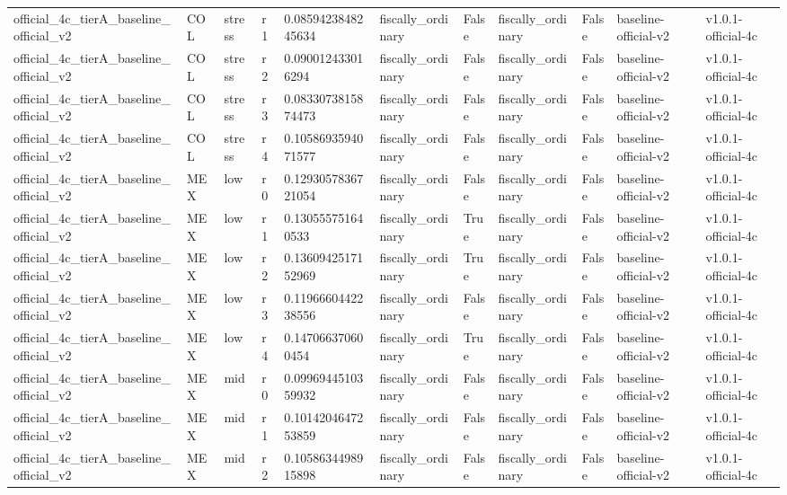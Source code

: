 \begin{landscape}
\begin{longtable}{lllllllllll}
official\_4c\_tierA\_baseline\_official\_v2 & COL & stress & r1 & 0.0859423848245634 & fiscally\_ordinary & False & fiscally\_ordinary & False & baseline-official-v2 & v1.0.1-official-4c \\
official\_4c\_tierA\_baseline\_official\_v2 & COL & stress & r2 & 0.090012433016294 & fiscally\_ordinary & False & fiscally\_ordinary & False & baseline-official-v2 & v1.0.1-official-4c \\
official\_4c\_tierA\_baseline\_official\_v2 & COL & stress & r3 & 0.0833073815874473 & fiscally\_ordinary & False & fiscally\_ordinary & False & baseline-official-v2 & v1.0.1-official-4c \\
official\_4c\_tierA\_baseline\_official\_v2 & COL & stress & r4 & 0.1058693594071577 & fiscally\_ordinary & False & fiscally\_ordinary & False & baseline-official-v2 & v1.0.1-official-4c \\
official\_4c\_tierA\_baseline\_official\_v2 & MEX & low & r0 & 0.1293057836721054 & fiscally\_ordinary & False & fiscally\_ordinary & False & baseline-official-v2 & v1.0.1-official-4c \\
official\_4c\_tierA\_baseline\_official\_v2 & MEX & low & r1 & 0.130555751640533 & fiscally\_ordinary & True & fiscally\_ordinary & False & baseline-official-v2 & v1.0.1-official-4c \\
official\_4c\_tierA\_baseline\_official\_v2 & MEX & low & r2 & 0.1360942517152969 & fiscally\_ordinary & True & fiscally\_ordinary & False & baseline-official-v2 & v1.0.1-official-4c \\
official\_4c\_tierA\_baseline\_official\_v2 & MEX & low & r3 & 0.1196660442238556 & fiscally\_ordinary & False & fiscally\_ordinary & False & baseline-official-v2 & v1.0.1-official-4c \\
official\_4c\_tierA\_baseline\_official\_v2 & MEX & low & r4 & 0.147066370600454 & fiscally\_ordinary & True & fiscally\_ordinary & False & baseline-official-v2 & v1.0.1-official-4c \\
official\_4c\_tierA\_baseline\_official\_v2 & MEX & mid & r0 & 0.0996944510359932 & fiscally\_ordinary & False & fiscally\_ordinary & False & baseline-official-v2 & v1.0.1-official-4c \\
official\_4c\_tierA\_baseline\_official\_v2 & MEX & mid & r1 & 0.1014204647253859 & fiscally\_ordinary & False & fiscally\_ordinary & False & baseline-official-v2 & v1.0.1-official-4c \\
official\_4c\_tierA\_baseline\_official\_v2 & MEX & mid & r2 & 0.1058634498915898 & fiscally\_ordinary & False & fiscally\_ordinary & False & baseline-official-v2 & v1.0.1-official-4c \\

\end{longtable}
\end{landscape}
